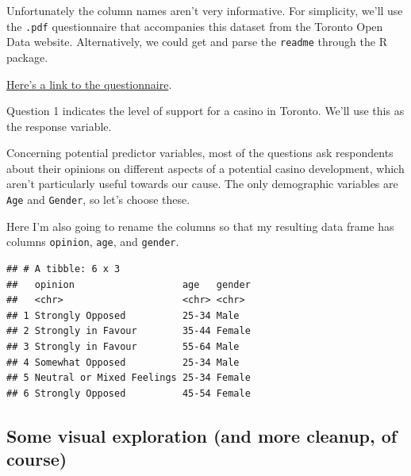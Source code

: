 \documentclass[
]{book}
\newenvironment{Shaded}{\begin{snugshade}}{\end{snugshade}}
\newcommand{\CommentTok}[1]{\textcolor[rgb]{0.56,0.35,0.01}{\textit{#1}}}
\newcommand{\DataTypeTok}[1]{\textcolor[rgb]{0.13,0.29,0.53}{#1}}
\newcommand{\KeywordTok}[1]{\textcolor[rgb]{0.13,0.29,0.53}{\textbf{#1}}}
\newcommand{\NormalTok}[1]{#1}
\newcommand{\OperatorTok}[1]{\textcolor[rgb]{0.81,0.36,0.00}{\textbf{#1}}}
\newcommand{\StringTok}[1]{\textcolor[rgb]{0.31,0.60,0.02}{#1}}
\begin{document}
Unfortunately the column names aren't very informative. For simplicity, we'll use the \texttt{.pdf} questionnaire that accompanies this dataset from the Toronto Open Data website. Alternatively, we could get and parse the \texttt{readme} through the R package.

\href{https://ckan0.cf.opendata.inter.prod-toronto.ca/dataset/427ca4cd-168a-4a37-883d-4a574277caf5/resource/ae135d6a-6921-4905-bc79-516fcd428b7b/download/toronto-casino-survey-feedback-form.pdf}{Here's a link to the questionnaire}.

Question 1 indicates the level of support for a casino in Toronto. We'll use this as the response variable.

Concerning potential predictor variables, most of the questions ask respondents about their opinions on different aspects of a potential casino development, which aren't particularly useful towards our cause. The only demographic variables are \texttt{Age} and \texttt{Gender}, so let's choose these.

Here I'm also going to rename the columns so that my resulting data frame has columns \texttt{opinion}, \texttt{age}, and \texttt{gender}.

\begin{Shaded}
\end{Shaded}

\begin{verbatim}
## # A tibble: 6 x 3
##   opinion                   age   gender
##   <chr>                     <chr> <chr> 
## 1 Strongly Opposed          25-34 Male  
## 2 Strongly in Favour        35-44 Female
## 3 Strongly in Favour        55-64 Male  
## 4 Somewhat Opposed          25-34 Male  
## 5 Neutral or Mixed Feelings 25-34 Female
## 6 Strongly Opposed          45-54 Female
\end{verbatim}

\hypertarget{some-visual-exploration-and-more-cleanup-of-course}{%
\subsection{Some visual exploration (and more cleanup, of course)}\label{some-visual-exploration-and-more-cleanup-of-course}}
\end{document}
